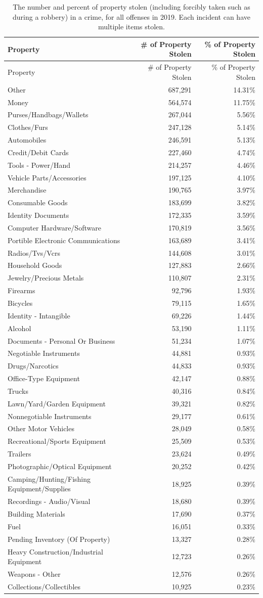 \documentclass[
  12pt,
  openany]{book}
\begin{document}
\begin{longtable}[]{@{}lrr@{}}
\caption{\label{tab:propertyStolenDescription}The number and percent of property stolen (including forcibly taken such as during a robbery) in a crime, for all offenses in 2019. Each incident can have multiple items stolen.}\tabularnewline
\toprule
Property & \# of Property Stolen & \% of Property Stolen\tabularnewline
\midrule
\endfirsthead
\toprule
Property & \# of Property Stolen & \% of Property Stolen\tabularnewline
\midrule
\endhead
Other & 687,291 & 14.31\%\tabularnewline
Money & 564,574 & 11.75\%\tabularnewline
Purses/Handbags/Wallets & 267,044 & 5.56\%\tabularnewline
Clothes/Furs & 247,128 & 5.14\%\tabularnewline
Automobiles & 246,591 & 5.13\%\tabularnewline
Credit/Debit Cards & 227,460 & 4.74\%\tabularnewline
Tools - Power/Hand & 214,257 & 4.46\%\tabularnewline
Vehicle Parts/Accessories & 197,125 & 4.10\%\tabularnewline
Merchandise & 190,765 & 3.97\%\tabularnewline
Consumable Goods & 183,699 & 3.82\%\tabularnewline
Identity Documents & 172,335 & 3.59\%\tabularnewline
Computer Hardware/Software & 170,819 & 3.56\%\tabularnewline
Portible Electronic Communications & 163,689 & 3.41\%\tabularnewline
Radios/Tvs/Vcrs & 144,608 & 3.01\%\tabularnewline
Household Goods & 127,883 & 2.66\%\tabularnewline
Jewelry/Precious Metals & 110,807 & 2.31\%\tabularnewline
Firearms & 92,796 & 1.93\%\tabularnewline
Bicycles & 79,115 & 1.65\%\tabularnewline
Identity - Intangible & 69,226 & 1.44\%\tabularnewline
Alcohol & 53,190 & 1.11\%\tabularnewline
Documents - Personal Or Business & 51,234 & 1.07\%\tabularnewline
Negotiable Instruments & 44,881 & 0.93\%\tabularnewline
Drugs/Narcotics & 44,833 & 0.93\%\tabularnewline
Office-Type Equipment & 42,147 & 0.88\%\tabularnewline
Trucks & 40,316 & 0.84\%\tabularnewline
Lawn/Yard/Garden Equipment & 39,321 & 0.82\%\tabularnewline
Nonnegotiable Instruments & 29,177 & 0.61\%\tabularnewline
Other Motor Vehicles & 28,049 & 0.58\%\tabularnewline
Recreational/Sports Equipment & 25,509 & 0.53\%\tabularnewline
Trailers & 23,624 & 0.49\%\tabularnewline
Photographic/Optical Equipment & 20,252 & 0.42\%\tabularnewline
Camping/Hunting/Fishing Equipment/Supplies & 18,925 & 0.39\%\tabularnewline
Recordings - Audio/Visual & 18,680 & 0.39\%\tabularnewline
Building Materials & 17,690 & 0.37\%\tabularnewline
Fuel & 16,051 & 0.33\%\tabularnewline
Pending Inventory (Of Property) & 13,327 & 0.28\%\tabularnewline
Heavy Construction/Industrial Equipment & 12,723 & 0.26\%\tabularnewline
Weapons - Other & 12,576 & 0.26\%\tabularnewline
Collections/Collectibles & 10,925 & 0.23\%\tabularnewline

\end{longtable}
\end{document}
